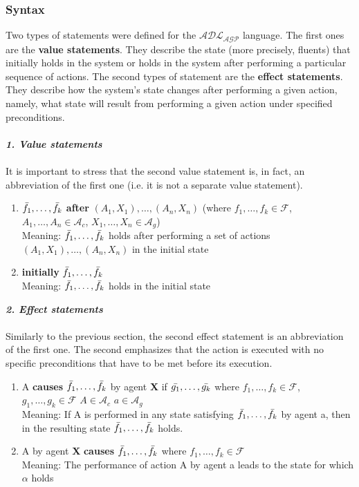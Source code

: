 \documentclass[a4paper]{article}
\begin{document}
\subsubsection{Syntax} \label{statements}
%
Two types of statements were defined for the $\mathcal{ADL_{AGP}}$ language. The first ones are the \textbf{value statements}. They describe the state (more precisely, fluents) that initially holds in the system or holds in the system after performing a particular sequence of actions. The second types of statement are the \textbf{effect statements}. They describe how the system's state changes after performing a given action, namely, what state will result from performing a given action under specified preconditions.
\\ \\
\textbf{\textit{1. Value statements}}
\\ \\
It is important to stress that the second value statement is, in fact, an abbreviation of the first one (i.e. it is not a separate value statement).
\begin{enumerate}
  \item $\Bar{f_1},\dotsc,\Bar{f_k}$ \textbf{after} $(A_1, X_1),\dotsc,(A_n, X_n)$ (where $f_1,\dotsc,f_k\in\mathcal{F}$, $A_1,\dotsc,A_n \in \mathcal{A}_c$, $X_1,\dotsc,X_n \in \mathcal{A}_g$) \\[0.5\baselineskip]
    Meaning: $\Bar{f_1},\dotsc,\Bar{f_k}$ holds after performing a set of actions $(A_1, X_1),\dotsc,(A_n, X_n)$ in the initial state
    \item \textbf{initially} $\Bar{f_1},\dotsc,\Bar{f_k}$ \\[0.5\baselineskip]
    Meaning: $\Bar{f_1},\dotsc,\Bar{f_k}$ holds in the initial state
\end{enumerate}
\textbf{\textit{2. Effect statements}}
\\ \\
Similarly to the previous section, the second effect statement is an abbreviation of the first one. 
The second emphasizes that the action is executed with no specific preconditions that have to be met before its execution.
\begin{enumerate}
  \item A \textbf{causes} $\Bar{f_1},\dotsc,\Bar{f_k}$ by agent \textbf{X} if $\Bar{g_1},\dotsc,\Bar{g_k}$ where $f_1,\dotsc,f_k\in\mathcal{F}$, $g_1,\dotsc,g_k\in\mathcal{F}$ $A\in\mathcal{A}_c$ $a\in\mathcal{A}_g$\\[0.5\baselineskip]
    Meaning: If A is performed in any state satisfying $\Bar{f_1},\dotsc,\Bar{f_k}$ by agent a, then in the resulting state $\Bar{f_1},\dotsc,\Bar{f_k}$ holds. 
    \item A by agent \textbf{X} \textbf{causes} $\Bar{f_1},\dotsc,\Bar{f_k}$ where $f_1,\dotsc,f_k\in\mathcal{F}$\\[0.5\baselineskip]
    Meaning: The performance of action A by agent a leads to the state for which $\alpha$ holds 
\end{enumerate}
%
\end{document}
